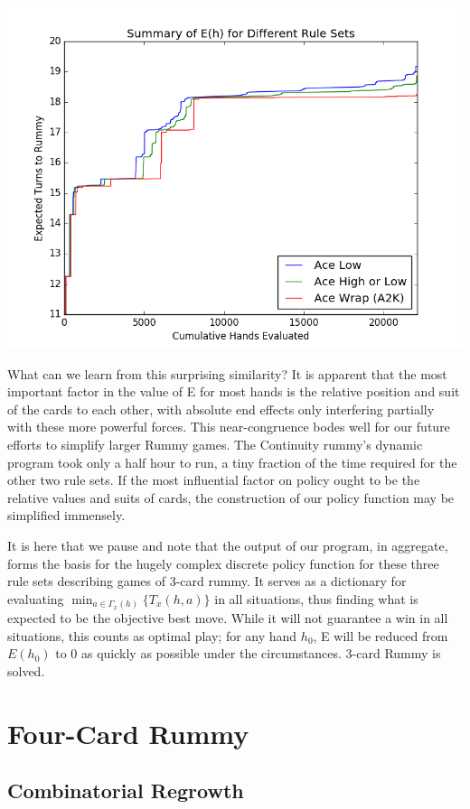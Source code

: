 \documentclass[paper=a4, fontsize=11pt,twoside]{report}   %
\begin{document}
\includegraphics[width=\textwidth]{fig2.png}

What can we learn from this surprising similarity? It is apparent that the most important factor in the value of E for most hands is the relative position and suit of the cards to each other, with absolute end effects only interfering partially with these more powerful forces.  This near-congruence bodes well for our future efforts to simplify larger Rummy games. The Continuity rummy’s dynamic program took only a half hour to run, a tiny fraction of the time required for the other two rule sets. If the most influential factor on policy ought to be the relative values and suits of cards, the construction of our policy function may be simplified immensely.

It is here that we pause and note that the output of our program, in aggregate, forms the basis for the hugely complex discrete policy function for these three rule sets describing games of 3-card rummy. It serves as a dictionary for evaluating $\min_{a\in \Gamma_x(h)}\{T_x(h,a)\}$ in all situations, thus finding what is expected to be the objective best move. While it will not guarantee a win in all situations, this counts as optimal play; for any hand $h_0$, E will be reduced from $E(h_0)$ to 0 as quickly as possible under the circumstances. 3-card Rummy is solved. 

\chapter{Four-Card Rummy}

\section{Combinatorial Regrowth}
\end{document}
